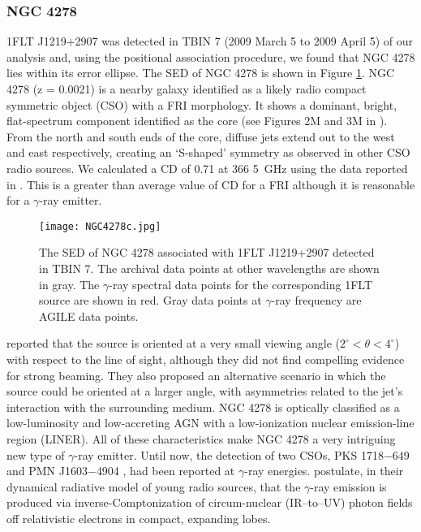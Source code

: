 \documentclass{aastex62}
\begin{document}
\subsubsection{NGC 4278}
1FLT J1219$+$2907 was detected in TBIN 7 (2009 March 5 to 2009 April 5) of our analysis and, using the positional association procedure, we found that NGC 4278 lies  within its error ellipse. The SED of NGC 4278 is shown in Figure \ref{figure:NGC4278}. NGC 4278 (z = 0.0021) is a nearby galaxy identified as a likely radio compact symmetric object (CSO) with a FRI  morphology. It shows a dominant, bright, flat-spectrum component identified as the core (see Figures 2M and 3M in \citealt{tremblay2016compact}). From the north and south ends of the core, diffuse jets extend out to the west and east respectively, creating an ‘S-shaped’ symmetry as observed in other CSO radio sources. We calculated a CD of 0.71 at 366 5~GHz using the data reported in \citet{schilizzi1983vlbi}. This is a greater than average value of CD for a FRI although it is reasonable for a $\gamma$-ray emitter.
\begin{figure}[hbt!]
    \centering
    \texttt{[image: NGC4278c.jpg]}
    \caption{The SED of NGC 4278 associated with 1FLT J1219+2907 detected in TBIN 7. The archival data points at other wavelengths are shown in gray. The $\gamma$-ray spectral data points for the corresponding 1FLT source are shown in red. Gray data points at $\gamma$-ray frequency are AGILE data points.}\label{figure:NGC4278}
\end{figure}

\citet{giroletti2005low} reported that the source is oriented at a very small viewing angle ($2^{\circ}<\theta<4^{\circ}$) with respect to the line of sight, although they did not
find compelling evidence for strong beaming. They also proposed an alternative scenario in which the source could be oriented at a larger angle, with asymmetries related to the jet's interaction with the surrounding medium. NGC 4278 is optically classified as a low-luminosity and low-accreting AGN with a low-ionization nuclear emission-line region (LINER).
All of these characteristics make NGC 4278 a very intriguing new type of $\gamma$-ray emitter. Until now, the detection of two CSOs, PKS 1718$-$649 \citep{migliori2016first} and PMN J1603$-$4904 \citep{krauss}, had been reported at $\gamma$-ray energies. \citet{stawarz2008momentum} postulate, in their dynamical radiative model of young radio sources, that the $\gamma$-ray emission is produced via inverse-Comptonization of circum-nuclear (IR–to–UV) photon fields off relativistic  electrons in compact, expanding lobes.
\end{document}
